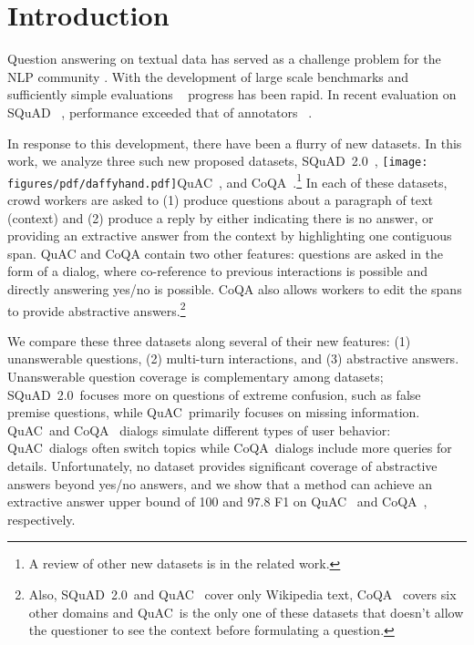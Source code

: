 \documentclass[11pt,a4paper]{article}
\newcommand{\quac}[0]{\daffy}
\newcommand{\quact}[0]{QuAC}
\newcommand{\coqa}[0]{CoQA}
\newcommand{\squad}[0]{SQuAD~2.0}
\newcommand{\daffy}[0]{\texttt{[image: figures/pdf/daffyhand.pdf]}}
\begin{document}
\section{Introduction}
\label{sec:introduction}
Question answering on textual data has served as a challenge problem for the NLP community \cite{voorhees2001trec,mctest}. 
With the development of large scale benchmarks and sufficiently simple evaluations ~\cite{trischler2016newsqa,Nguyen2016MSMA,hermann2015teaching} progress has been rapid. 
In recent evaluation on SQuAD ~\cite{rajpurkar2016squad}, performance exceeded that of annotators ~\cite{wang2018multi,hu2017reinforced,wang2017gated}. 

In response to this development, there have been a flurry of new datasets. In this work, we analyze three such new proposed datasets, \squad~\cite{Rajpurkar2018KnowWY}, \quac\quact~\cite{ChoiQuAC2018}, and \coqa~\cite{Reddy18}.\footnote{A review of other new datasets is in the related work.}
In each of these datasets, crowd workers are asked to (1) produce questions about a paragraph of text (context) and (2) produce a reply by either indicating there is no answer, or providing an extractive answer from the context by highlighting one contiguous span.
QuAC and CoQA contain two other features: questions are asked in the form of a dialog, where co-reference to previous interactions is possible and directly answering yes/no is possible.
CoQA also allows workers to edit the spans to provide abstractive answers.\footnote{Also, \squad~and \quact~ cover only Wikipedia text, \coqa~ covers six other domains and \quact~is the only one of these datasets that doesn't allow the questioner to see the context before formulating a question.} 


 
 
We compare these three datasets along several of their new features: (1) unanswerable questions, (2) multi-turn interactions, and (3) abstractive answers.
Unanswerable question coverage is complementary among datasets; 
\squad~focuses more on questions of extreme confusion, such as false premise questions, while \quact~primarily focuses on missing information.
\quact~and \coqa~ dialogs simulate different types of user behavior: \quact~dialogs often switch topics while \coqa~dialogs include more queries for details.
Unfortunately, no dataset provides significant coverage of abstractive answers beyond yes/no answers, and we show that a method can achieve an extractive answer upper bound of 100 and 97.8 F1 on \quact~ and \coqa~, respectively.
\end{document}
